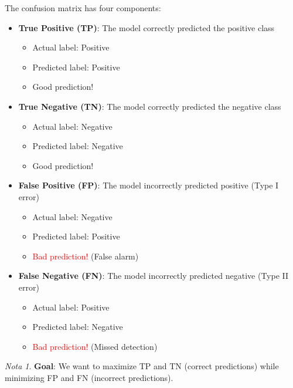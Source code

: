 \documentclass[11pt,a4paper]{article}
\theoremstyle{definition}
\theoremstyle{plain}
\theoremstyle{remark}
\newtheorem*{remark}{Nota}
\begin{document}
The confusion matrix has four components:

\begin{itemize}
    \item \textbf{True Positive (TP)}: The model correctly predicted the positive class
    \begin{itemize}
        \item Actual label: Positive
        \item Predicted label: Positive
        \item \textcolor{blue!70}{Good prediction!}
    \end{itemize}
    
    \item \textbf{True Negative (TN)}: The model correctly predicted the negative class
    \begin{itemize}
        \item Actual label: Negative
        \item Predicted label: Negative
        \item \textcolor{green!60!black}{Good prediction!}
    \end{itemize}
    
    \item \textbf{False Positive (FP)}: The model incorrectly predicted positive (Type I error)
    \begin{itemize}
        \item Actual label: Negative
        \item Predicted label: Positive
        \item \textcolor{red}{Bad prediction!} (False alarm)
    \end{itemize}
    
    \item \textbf{False Negative (FN)}: The model incorrectly predicted negative (Type II error)
    \begin{itemize}
        \item Actual label: Positive
        \item Predicted label: Negative
        \item \textcolor{red}{Bad prediction!} (Missed detection)
    \end{itemize}
\end{itemize}

\begin{remark}
\textbf{Goal}: We want to maximize TP and TN (correct predictions) while minimizing FP and FN (incorrect predictions).
\end{remark}
\end{document}
